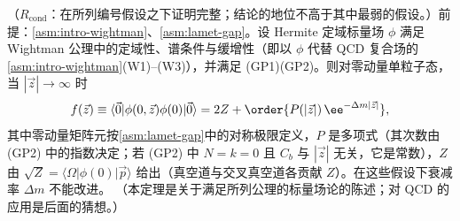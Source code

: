 \begin{theorem}\label{thm:lamet-exp-decay}
（$R_{\mathrm{cond}}$：在所列编号假设之下证明完整；结论的地位不高于其中最弱的假设。）前提：\cref{asm:intro-wightman}、\cref{asm:lamet-gap}。设 Hermite 定域标量场 $\phi$ 满足 Wightman 公理中的定域性、谱条件与缓增性（即以 $\phi$ 代替 QCD 复合场的\cref{asm:intro-wightman}(W1)--(W3)），并满足 (GP1)(GP2)。则对零动量单粒子态，当 $|\vec z|\to\infty$ 时
\begin{equation}\label{eq:lamet-expdecay}
f(\vec z)\equiv\langle\vec 0|\phi(0,\vec z)\phi(0)|\vec 0\rangle=2Z+\order{P(|\vec z|)\,\ee^{-\Delta m|\vec z|}},
\end{equation}%
其中零动量矩阵元按\cref{asm:lamet-gap}中的对称极限定义，$P$ 是多项式（其次数由 (GP2) 中的指数决定；若 (GP2) 中 $N=k=0$ 且 $C_b$ 与 $|\vec z|$ 无关，它是常数），$Z$ 由 $\sqrt Z=\langle\Omega|\phi(0)|\vec p\rangle$ 给出（真空道与交叉真空道各贡献 $Z$）。在这些假设下衰减率 $\Delta m$ 不能改进。
（本定理是关于满足所列公理的标量场论的陈述；对 QCD 的应用是后面的猜想。）
\end{theorem}

